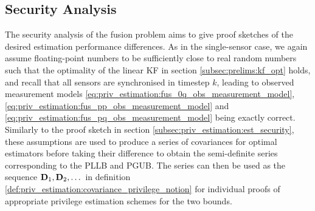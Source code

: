 % 
% 
\subsection{Security Analysis}\label{subsec:priv_estimation:fus_security}
The security analysis of the fusion problem aims to give proof sketches of the desired estimation performance differences. As in the single-sensor case, we again assume floating-point numbers to be sufficiently close to real random numbers such that the optimality of the linear KF in section \ref{subsec:prelims:kf_opt} holds, and recall that all sensors are synchronised in timestep $k$, leading to observed measurement models \eqref{eq:priv_estimation:fus_0q_obs_measurement_model}, \eqref{eq:priv_estimation:fus_pp_obs_measurement_model} and \eqref{eq:priv_estimation:fus_pq_obs_measurement_model} being exactly correct. Similarly to the proof sketch in section \ref{subsec:priv_estimation:est_security}, these assumptions are used to produce a series of covariances for optimal estimators before taking their difference to obtain the semi-definite series corresponding to the PLLB and PGUB. The series can then be used as the sequence ${{\mathbf{D}}}_1,{{\mathbf{D}}}_2,\dots$ in definition \ref{def:priv_estimation:covariance_privilege_notion} for individual proofs of appropriate privilege estimation schemes for the two bounds.

% 
% 

